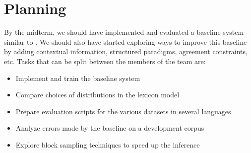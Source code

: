 \documentclass{article}
\begin{document}
\section{Planning}
By the midterm, we should have implemented and evaluated a baseline system similar to \cite{goldwater2011}. We should also have started exploring ways to improve this baseline by adding contextual information, structured paradigms, agreement constraints, etc.
Tasks that can be split between the members of the team are:
\begin{itemize}
  \item Implement and train the baseline system
  \item Compare choices of distributions in the lexicon model
  \item Prepare evaluation scripts for the various datasets in several languages
  \item Analyze errors made by the baseline on a development corpus
  \item Explore block sampling techniques to speed up the inference
\end{itemize}



\end{document}

